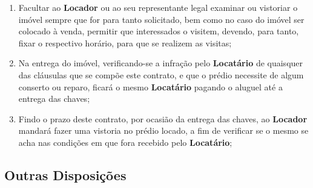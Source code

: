 \begin{enumerate}
    \item Facultar ao \textbf{Locador} ou ao seu representante legal examinar ou vistoriar o imóvel sempre que for para tanto solicitado, bem como no caso do imóvel ser colocado à venda, permitir que interessados o visitem, devendo, para tanto, fixar o respectivo horário, para que se realizem as visitas; 
    \item Na entrega do imóvel, verificando-se a infração pelo \textbf{Locatário} de quaisquer das cláusulas que se compõe este contrato, e que o prédio necessite de algum conserto ou reparo, ficará o mesmo \textbf{Locatário} pagando o aluguel até a entrega das chaves;
    \item Findo o prazo deste contrato, por ocasião da entrega das chaves, ao \textbf{Locador} mandará fazer uma vistoria no prédio locado, a fim de verificar se o mesmo se acha nas condições em que fora recebido pelo \textbf{Locatário};
\end{enumerate}

\subsection{Outras Disposições}\label{sub-seb:general-rules}


